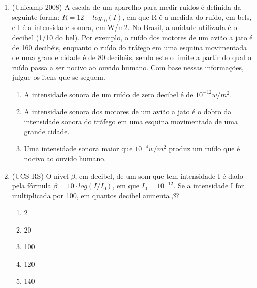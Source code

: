 \begin{enumerate}
\item {} \label{Unicamp2008}

(Unicamp-2008) A escala de um aparelho para medir ruídos é definida da seguinte forma: $R = 12 + log_{10}(I)$, em que R 
é a medida do ruído, em bels, e I é a intensidade sonora, em W/m2. No Brasil, a unidade utilizada é o decibel (1/10 do 
bel). Por exemplo, o ruído dos motores de um avião a jato é de 160 decibéis, enquanto o ruído do tráfego em uma esquina 
movimentada de uma grande cidade é de 80 decibéis, sendo este o limite a partir do qual o ruído passa a ser nocivo ao 
ouvido humano. Com base nessas informações, julgue os itens que se seguem.

\begin{enumerate}
\item A intensidade sonora de um ruído de zero decibel é de $10^{-12} w/m^2$. 

\item A intensidade sonora dos motores de um avião a jato é o dobro da intensidade sonora do tráfego em uma esquina movimentada de uma grande cidade.

\item Uma intensidade sonora maior que $10^{-4} w/m^2$ produz um ruído que é nocivo ao ouvido humano. 
\end{enumerate}


\item {}\label{UCSSRS}

(UCS-RS) O nível $\beta$, em decibel, de um som que tem intensidade I é dado pela fórmula $\beta = 10 \cdot log 
(I/I_0)$, em que $I_0 = 10^{-12}$. Se a intensidade I for multiplicada por 100, em quantos decibel aumenta $\beta$?

\begin{enumerate}
    \item 2
    \item 20
    \item 100
    \item 120
    \item 140
\end{enumerate}
\end{enumerate}

